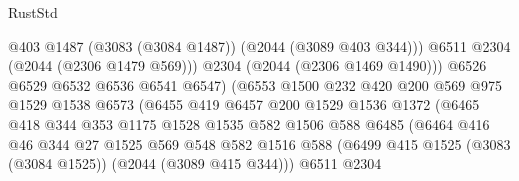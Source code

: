 \begin{lexlean}{RustStd}
\begin{coremodule}
                                      @403
                                      @1487
                                      (@3083 (@3084 @1487))
                                      (@2044 (@3089 @403 @344)))
                                    @6511
                                    @2304
                                    (@2044 (@2306 @1479 @569)))
                                  @2304
                                  (@2044 (@2306 @1469 @1490)))
                                @6526
                                @6529
                                @6532
                                @6536
                                @6541
                                @6547)
                              (@6553
                                @1500
                                @232
                                @420
                                @200
                                @569
                                @975
                                @1529
                                @1538
                                @6573
                                (@6455
                                  @419
                                  @6457
                                  @200
                                  @1529
                                  @1536
                                  @1372
                                  (@6465
                                    @418
                                    @344
                                    @353
                                    @1175
                                    @1528
                                    @1535
                                    @582
                                    @1506
                                    @588
                                    @6485
                                    (@6464
                                      @416
                                      @46
                                      @344
                                      @27
                                      @1525
                                      @569
                                      @548
                                      @582
                                      @1516
                                      @588
                                      (@6499
                                        @415
                                        @1525
                                        (@3083 (@3084 @1525))
                                        (@2044 (@3089 @415 @344)))
                                      @6511
                                      @2304

\end{coremodule}
\end{lexlean}
